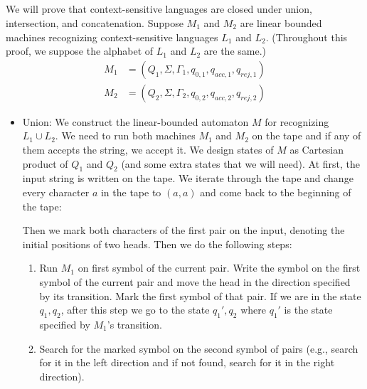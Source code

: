 \documentclass{article}
\begin{document}
\subsection{}
We will prove that context-sensitive languages are closed under union, intersection, and concatenation.
Suppose \(M_1\) and \(M_2\) are linear bounded machines recognizing context-sensitive languages \(L_1\) and \(L_2\).
(Throughout this proof, we suppose the alphabet of \(L_1\) and \(L_2\) are the same.)
\begin{align*}
M_1 &= (Q_1, \Sigma, \Gamma_1, q_{0, 1}, q_{acc, 1}, q_{rej, 1})\\
M_2 &= (Q_2, \Sigma, \Gamma_2, q_{0, 2}, q_{acc, 2}, q_{rej, 2})
\end{align*}
\begin{itemize}
\item Union:
We construct the linear-bounded automaton \(M\) for recognizing \(L_1 \cup L_2\).
We need to run both machines \(M_1\) and \(M_2\) on the tape and if any of them accepts the string, we accept it.
We design states of \(M\) as Cartesian product of \(Q_1\) and \(Q_2\) (and some extra states that we will need).
At first, the input string is written on the tape.
We iterate through the tape and change every character \(a\) in the tape to \((a, a)\) and come back to the beginning of the tape:
\begin{figure}[H]
\centering

\end{figure}
Then we mark both characters of the first pair on the input, denoting the initial positions of two heads.
Then we do the following steps:
\begin{enumerate}
\item Run \(M_1\) on first symbol of the current pair.
Write the symbol on the first symbol of the current pair and move the head in the direction specified by its transition. Mark the first symbol of that pair.
If we are in the state \(q_1, q_2\), after this step we go to the state \(q_1', q_2\) where \(q_1'\) is the state specified by \(M_1\)'s transition.
\item Search for the marked symbol on the second symbol of pairs (e.g., search for it in the left direction and if not found, search for it in the right direction).

\end{enumerate}
\end{itemize}
\end{document}
